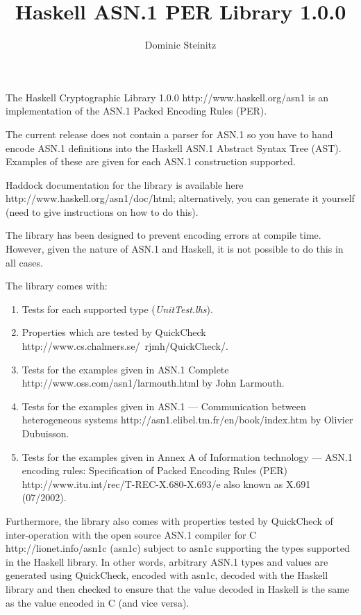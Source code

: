 \documentclass{article}
\title{Haskell ASN.1 PER Library 1.0.0}
\author{Dominic Steinitz}
\begin{document}
\maketitle

The 
\htmladdnormallinkfoot
{Haskell Cryptographic Library 1.0.0}
{http://www.haskell.org/asn1}
is an implementation of the ASN.1 Packed Encoding Rules (PER).

The current release does not contain a parser for ASN.1 so you have to hand encode
ASN.1 definitions into the Haskell ASN.1 Abstract Syntax Tree (AST). Examples of these are given
for each ASN.1 construction supported.

Haddock documentation for the library is available
\htmladdnormallinkfoot
{here}
{http://www.haskell.org/asn1/doc/html};
alternatively, you can generate it yourself (need to give instructions on how to do this).

The library has been designed to prevent encoding errors at compile time. However, given the nature
of ASN.1 and Haskell, it is not possible to do this in all cases.

The library comes with:

\begin{enumerate}

\item
Tests for each supported type ({\em UnitTest.lhs}).

\item
Properties which are tested
by
\htmladdnormallinkfoot
{QuickCheck}
{http://www.cs.chalmers.se/~rjmh/QuickCheck/}.

\item
Tests for the examples given in
\htmladdnormallinkfoot
{ASN.1 Complete}
{http://www.oss.com/asn1/larmouth.html}
by John Larmouth.

\item
Tests for the examples given in
\htmladdnormallinkfoot
{ASN.1 --- Communication between heterogeneous systems}
{http://asn1.elibel.tm.fr/en/book/index.htm}
by Olivier Dubuisson.

\item
Tests for the examples given in Annex A of
\htmladdnormallinkfoot
{Information technology --- ASN.1 encoding rules: Specification of Packed Encoding Rules (PER)}
{http://www.itu.int/rec/T-REC-X.680-X.693/e}
also known as X.691 (07/2002).

\end{enumerate}

Furthermore, the library also comes with properties tested by QuickCheck of inter-operation with
\htmladdnormallinkfoot
{the open source ASN.1 compiler for C}
{http://lionet.info/asn1c}
(asn1c) subject to asn1c supporting the types supported in the Haskell
library. In other words, arbitrary ASN.1 types and values are generated using QuickCheck,
encoded with asn1c, decoded with the Haskell library and then checked
to ensure that the value decoded in Haskell is the same as the value
encoded in C (and vice versa).
\end{document}
